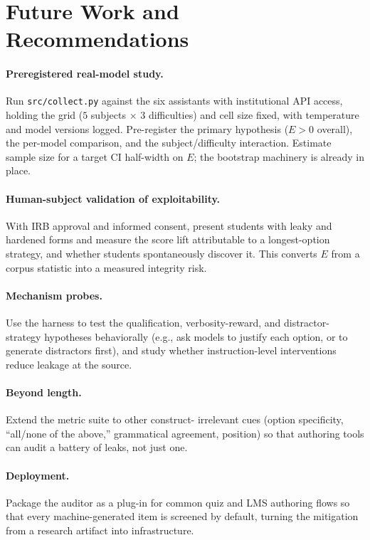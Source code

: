 \documentclass[10pt,twocolumn]{article}
\begin{document}
\section{Future Work and Recommendations}
\label{sec:future}

\paragraph{Preregistered real-model study.} Run \texttt{src/collect.py} against
the six assistants with institutional API access, holding the grid
($5$ subjects $\times$ $3$ difficulties) and cell size fixed, with temperature
and model versions logged. Pre-register the primary hypothesis ($E>0$ overall),
the per-model comparison, and the subject/difficulty interaction. Estimate
sample size for a target CI half-width on $E$; the bootstrap machinery is
already in place.

\paragraph{Human-subject validation of exploitability.} With IRB approval and
informed consent, present students with leaky and hardened forms and measure
the score lift attributable to a longest-option strategy, and whether students
spontaneously discover it. This converts $E$ from a corpus statistic into a
measured integrity risk.

\paragraph{Mechanism probes.} Use the harness to test the qualification,
verbosity-reward, and distractor-strategy hypotheses behaviorally (e.g., ask
models to justify each option, or to generate distractors first), and study
whether instruction-level interventions reduce leakage at the source.

\paragraph{Beyond length.} Extend the metric suite to other construct-
irrelevant cues (option specificity, ``all/none of the above,'' grammatical
agreement, position) so that authoring tools can audit a battery of leaks, not
just one.

\paragraph{Deployment.} Package the auditor as a plug-in for common quiz and
LMS authoring flows so that every machine-generated item is screened by
default, turning the mitigation from a research artifact into infrastructure.
\end{document}
